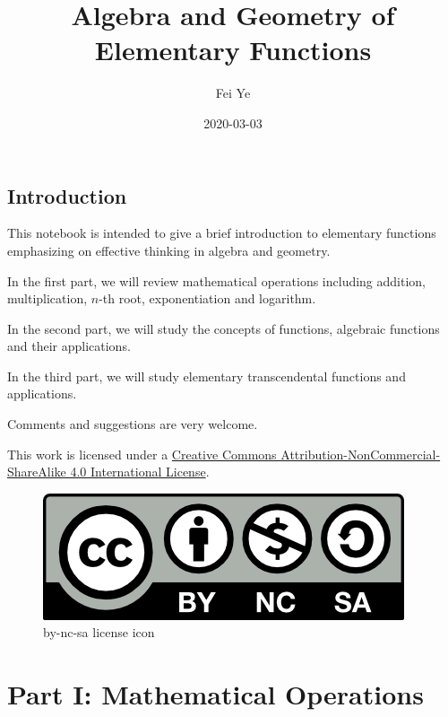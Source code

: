 \documentclass[en,11pt]{elegantbook}
\title{Algebra and Geometry of Elementary Functions}
\author{Fei Ye}
\date{2020-03-03}
\renewcommand{\baselinestretch}{1.1}
\renewcommand{\baselinestretch}{0.975}
\begin{document}
\maketitle

{
\setcounter{tocdepth}{0}
\tableofcontents
}
\mainmatter

\hypersetup{pageanchor=true}

\renewcommand{\baselinestretch}{1.05}\normalsize

\captionsetup[figure]{labelformat=empty}
\captionsetup[subfigure]{labelformat=empty}

\hypertarget{introduction}{%
\chapter*{Introduction}\label{introduction}}

This notebook is intended to give a brief introduction to elementary functions emphasizing on effective thinking in algebra and geometry.

In the first part, we will review mathematical operations including addition, multiplication, \(n\)-th root, exponentiation and logarithm.

In the second part, we will study the concepts of functions, algebraic functions and their applications.

In the third part, we will study elementary transcendental functions and applications.

Comments and suggestions are very welcome.

This work is licensed under a \href{https://creativecommons.org/licenses/by-nc-sa/4.0/}{Creative Commons Attribution-NonCommercial-ShareAlike 4.0 International License}.

\begin{figure}
\centering
\includegraphics{figs/by-nc-sa.png}
\caption{by-nc-sa license icon}
\end{figure}

\hypertarget{part-part-i-mathematical-operations}{%
\part*{Part I: Mathematical Operations}\label{part-part-i-mathematical-operations}}
\end{document}
